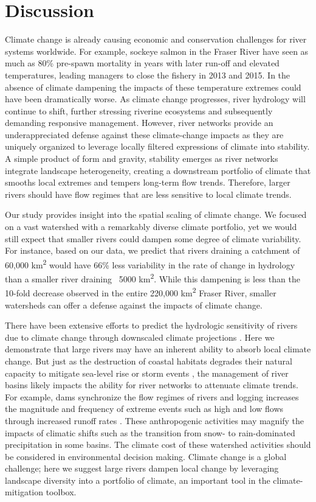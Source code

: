 \documentclass[9pt,twocolumn,twoside,lineno]{pnas-new}
\begin{document}
\section*{Discussion}

Climate change is already causing economic and conservation challenges for river systems worldwide\citep{Palmer:2009}. For example, sockeye salmon in the Fraser River have seen as much as 80\% pre-spawn mortality in years with later run-off and elevated temperatures, leading managers to close the fishery in 2013 and 2015. In the absence of climate dampening the impacts of these temperature extremes could have been dramatically worse. As climate change progresses, river hydrology will continue to shift, further stressing riverine ecosystems and subsequently demanding responsive management. However, river networks provide an underappreciated defense against these climate-change impacts as they are uniquely organized to leverage locally filtered expressions of climate into stability. A simple product of form and gravity, stability emerges as river networks integrate landscape heterogeneity, creating a downstream portfolio of climate that smooths local extremes and tempers long-term flow trends. Therefore, larger rivers should have flow regimes that are less sensitive to local climate trends.

Our study provides insight into the spatial scaling of climate change. We focused on a vast watershed with a remarkably diverse climate portfolio, yet we would still expect that smaller rivers could dampen some degree of climate variability. For instance, based on our data, we predict that rivers draining a catchment of 60,000 km\textsuperscript{2} would have 66\% less variability in the rate of change in hydrology than a smaller river draining ~5000 km\textsuperscript{2}. While this dampening is less than the 10-fold decrease observed in the entire 220,000 km\textsuperscript{2} Fraser River, smaller watersheds can offer a defense against the impacts of climate change.

There have been extensive efforts to predict the hydrologic sensitivity of rivers due to climate change through downscaled climate projections \citep{Nijssen:2001}. Here we demonstrate that large rivers may have an inherent ability to absorb local climate change. But just as the destruction of coastal habitats degrades their natural capacity to mitigate sea-level rise or storm events \citep{Arkema:2013}, the management of river basins likely impacts the ability for river networks to attenuate climate trends. For example, dams synchronize the flow regimes of rivers \citep{Poff:2007} and logging increases the magnitude and frequency of extreme events such as high and low flows through increased runoff rates \citep{Zhang:2014}. These anthropogenic activities may magnify the impacts of climatic shifts such as the transition from snow- to rain-dominated precipitation in some basins. The climate cost of these watershed activities should be considered in environmental decision making. Climate change is a global challenge; here we suggest large rivers dampen local change by leveraging landscape diversity into a portfolio of climate, an important tool in the climate-mitigation toolbox.
\end{document}
